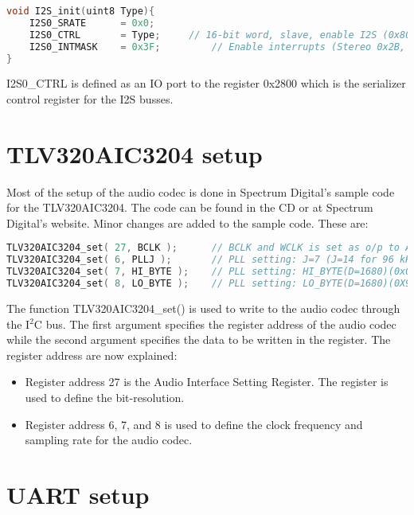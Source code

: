 \begin{lstlisting}[language=C, caption = {Setup of I2S port for the DSP},label={listingI2SDSP}]
void I2S_init(uint8 Type){
	I2S0_SRATE 		= 0x0;
    I2S0_CTRL 		= Type;    	// 16-bit word, slave, enable I2S (0x8010), stereo. 24-bit word, slave, enable I2S, mono (0x901C). 
    I2S0_INTMASK 	= 0x3F;    		// Enable interrupts (Stereo 0x2B, Mono 0x17)
}
\end{lstlisting}

I2S0\_CTRL is defined as an IO port to the register 0x2800 which is the serializer control register for the I2S busses.

\section{TLV320AIC3204 setup}

Most of the setup of the audio codec is done in Spectrum Digital's sample code for the TLV320AIC3204. The code can be found in the CD or at Spectrum Digital's website. Minor changes are added to the sample code. These are:

\begin{lstlisting}[language=C, caption = {Setup of I2S port for the DSP},label={listingI2SDSP}]
TLV320AIC3204_set( 27, BCLK );      // BCLK and WCLK is set as o/p to AIC3204(Master) (0x2D for 24-bit)
TLV320AIC3204_set( 6, PLLJ );       // PLL setting: J=7	(J=14 for 96 kHz)
TLV320AIC3204_set( 7, HI_BYTE );    // PLL setting: HI_BYTE(D=1680)(0x06) (D=3360 for 96 kHz)(0x0D)
TLV320AIC3204_set( 8, LO_BYTE );    // PLL setting: LO_BYTE(D=1680)(0X90) (D=3360 for 96 kHz)(0x20)
\end{lstlisting}

The function TLV320AIC3204\_set() is used to write to the audio codec through the I$^2$C bus. The first argument specifies the register address of the audio codec while the second argument specifies the data to be written in the register. The register address are now explained:

\begin{itemize}
\item[•]Register address 27 is the Audio Interface Setting Register. The register is used to define the bit-resolution.
\item[•]Register address 6, 7, and 8 is used to define the clock frequency and sampling rate for the audio codec.
\end{itemize}


\section{UART setup} \label{UART_setup}

